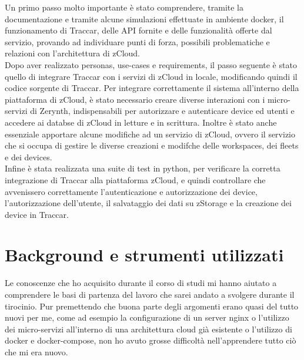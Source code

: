 \documentclass[a4paper,titlepage,12pt]{report}
\begin{document}
{Un primo passo molto importante è stato comprendere, tramite la documentazione e tramite alcune simulazioni effettuate in ambiente docker, il funzionamento di Traccar, delle API fornite e delle funzionalità offerte dal servizio, provando ad individuare punti di forza, possibili problematiche e relazioni con l'architettura di zCloud.  \\
Dopo aver realizzato personas, use-cases e requirements, il passo seguente è stato quello di integrare Traccar con i servizi di zCloud in locale, modificando quindi il codice sorgente di Traccar. Per integrare correttamente il sistema all'interno della piattaforma di zCloud, è stato necessario creare diverse interazioni con i micro-servizi di Zerynth, indispensabili per autorizzare e autenticare device ed utenti e accedere ai databse di zCloud in letture e in scrittura. Inoltre è stato anche essenziale apportare alcune modifiche ad un servizio di zCloud, ovvero il servizio che si occupa di gestire le diverse creazioni e modifche delle workspaces, dei fleets e dei devices. \\
Infine è stata realizzata una suite di test in python, per verificare la corretta integrazione di Traccar alla piattaforma zCloud, e quindi controllare che avvenissero correttamente l'autenticazione e autorizzazione dei device, l'autorizzazione dell'utente, il salvataggio dei dati su zStorage e la creazione dei device in Traccar.
\chapter{
Background e strumenti utilizzati}
Le conoscenze che ho acquisito durante il corso di studi mi hanno aiutato a comprendere le basi di partenza del lavoro che sarei andato a svolgere durante il tirocinio. Pur premettendo che buona parte degli argomenti erano quasi del tutto nuovi per me, come ad esempio la configurazione di un server nginx o l'utilizzo dei micro-servizi all'interno di una architettura cloud già esistente o l'utilizzo di docker e docker-compose, non ho avuto grosse difficoltà nell'apprendere tutto ciò che mi era nuovo.


{
}}
\end{document}
